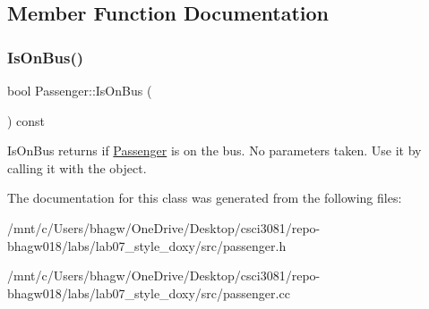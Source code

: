 \subsection{Member Function Documentation}
\mbox{\label{classPassenger_a2acf008ec444afcc859b914ee24add0e}} 
\subsubsection{\texorpdfstring{Is\+On\+Bus()}{IsOnBus()}}
{\footnotesize\ttfamily bool Passenger\+::\+Is\+On\+Bus (\begin{DoxyParamCaption}{ }\end{DoxyParamCaption}) const}

Is\+On\+Bus returns if \hyperlink{classPassenger}{Passenger} is on the bus. No parameters taken. Use it by calling it with the object. 

The documentation for this class was generated from the following files\+:\begin{DoxyCompactItemize}
\item 
/mnt/c/\+Users/bhagw/\+One\+Drive/\+Desktop/csci3081/repo-\/bhagw018/labs/lab07\+\_\+style\+\_\+doxy/src/passenger.\+h\item 
/mnt/c/\+Users/bhagw/\+One\+Drive/\+Desktop/csci3081/repo-\/bhagw018/labs/lab07\+\_\+style\+\_\+doxy/src/passenger.\+cc\end{DoxyCompactItemize}
